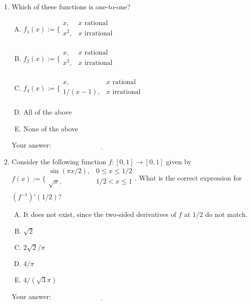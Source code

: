 \documentclass[10pt]{amsart}
\begin{document}
\begin{enumerate}
\item Which of these functions is one-to-one? 

  \begin{enumerate}[(A)]
  \item $f_1(x) := \lbrace \begin{array}{rl} x, & x \text{ rational} \\ x^2, & x \text{ irrational}\\\end{array}$ 
  \item $f_2(x) := \lbrace \begin{array}{rl} x, & x \text{ rational} \\ x^3, & x \text{ irrational}\\\end{array}$
  \item $f_3(x) := \lbrace\begin{array}{rl} x, & x \text{ rational} \\ 1/(x - 1), & x \text{ irrational}\\\end{array}$
  \item All of the above
  \item None of the above
  \end{enumerate}

  \vspace{0.05in}
  Your answer: $\underline{\qquad\qquad\qquad\qquad\qquad\qquad\qquad}$
  \vspace{0.05in}

\item Consider the following function $f:[0,1] \to [0,1]$ given by
  $f(x) := \lbrace\begin{array}{rl} \sin(\pi x/2), & 0 \le x \le 1/2 \\
  \sqrt{x}, & 1/2 < x \le 1\\\end{array}$. What is the correct
  expression for $(f^{-1})'(1/2)$? 
  \begin{enumerate}[(A)]
  \item It does not exist, since the two-sided derivatives of $f$ at
    $1/2$ do not match.
  \item $\sqrt{2}$
  \item $2\sqrt{2}/\pi$
  \item $4/\pi$
  \item $4/(\sqrt{3}\pi)$
  \end{enumerate}

  \vspace{0.05in}
  Your answer: $\underline{\qquad\qquad\qquad\qquad\qquad\qquad\qquad}$

\end{enumerate}
\end{document}
